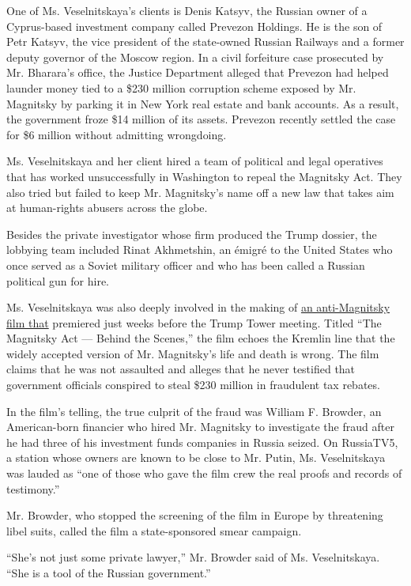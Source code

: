 One of Ms. Veselnitskaya's clients is Denis Katsyv, the Russian owner of
a Cyprus-based investment company called Prevezon Holdings. He is the
son of Petr Katsyv, the vice president of the state-owned Russian
Railways and a former deputy governor of the Moscow region. In a civil
forfeiture case prosecuted by Mr. Bharara's office, the Justice
Department alleged that Prevezon had helped launder money tied to a
\$230 million corruption scheme exposed by Mr. Magnitsky by parking it
in New York real estate and bank accounts. As a result, the government
froze \$14 million of its assets. Prevezon recently settled the case for
\$6 million without admitting wrongdoing.

Ms. Veselnitskaya and her client hired a team of political and legal
operatives that has worked unsuccessfully in Washington to repeal the
Magnitsky Act. They also tried but failed to keep Mr. Magnitsky's name
off a new law that takes aim at human-rights abusers across the globe.

Besides the private investigator whose firm produced the Trump dossier,
the lobbying team included Rinat Akhmetshin, an émigré to the United
States who once served as a Soviet military officer and who has been
called a Russian political gun for hire.

Ms. Veselnitskaya was also deeply involved in the making of
\href{https://www.nytimes3xbfgragh.onion/2016/06/10/world/europe/sergei-magnitsky-russia-vladimir-putin.html}{an
anti-Magnitsky film that} premiered just weeks before the Trump Tower
meeting. Titled ``The Magnitsky Act --- Behind the Scenes,'' the film
echoes the Kremlin line that the widely accepted version of Mr.
Magnitsky's life and death is wrong. The film claims that he was not
assaulted and alleges that he never testified that government officials
conspired to steal \$230 million in fraudulent tax rebates.

In the film's telling, the true culprit of the fraud was William F.
Browder, an American-born financier who hired Mr. Magnitsky to
investigate the fraud after he had three of his investment funds
companies in Russia seized. On RussiaTV5, a station whose owners are
known to be close to Mr. Putin, Ms. Veselnitskaya was lauded as ``one of
those who gave the film crew the real proofs and records of testimony.''

Mr. Browder, who stopped the screening of the film in Europe by
threatening libel suits, called the film a state-sponsored smear
campaign.

``She's not just some private lawyer,'' Mr. Browder said of Ms.
Veselnitskaya. ``She is a tool of the Russian government.''

